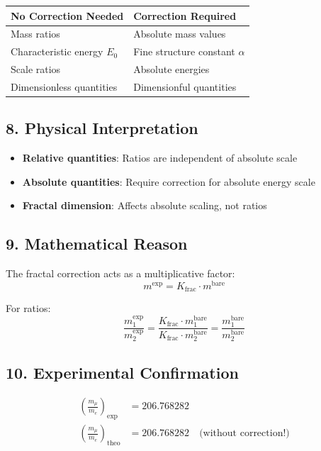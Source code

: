 	\begin{tabular}{p{}p{}}
		\textbf{No Correction Needed} & \textbf{Correction Required} \\
		\hline
		Mass ratios & Absolute mass values \\
		Characteristic energy $E_0$ & Fine structure constant $\alpha$ \\
		Scale ratios & Absolute energies \\
		Dimensionless quantities & Dimensionful quantities \\
	\end{tabular}
	
	\subsection*{8. Physical Interpretation}
	
	\begin{itemize}
		\item \textbf{Relative quantities}: Ratios are independent of absolute scale
		\item \textbf{Absolute quantities}: Require correction for absolute energy scale
		\item \textbf{Fractal dimension}: Affects absolute scaling, not ratios
	\end{itemize}
	
	\subsection*{9. Mathematical Reason}
	
	The fractal correction acts as a multiplicative factor:
	\[
	m^{\text{exp}} = K_{\text{frac}} \cdot m^{\text{bare}}
	\]
	
	For ratios:
	\[
	\frac{m_1^{\text{exp}}}{m_2^{\text{exp}}} = \frac{K_{\text{frac}} \cdot m_1^{\text{bare}}}{K_{\text{frac}} \cdot m_2^{\text{bare}}} = \frac{m_1^{\text{bare}}}{m_2^{\text{bare}}}
	\]
	
	\subsection*{10. Experimental Confirmation}
	
	\begin{align*}
		\left(\frac{m_\mu}{m_e}\right)_{\text{exp}} &= 206.768282 \\
		\left(\frac{m_\mu}{m_e}\right)_{\text{theo}} &= 206.768282 \quad \text{(without correction!)}
	\end{align*}
	
